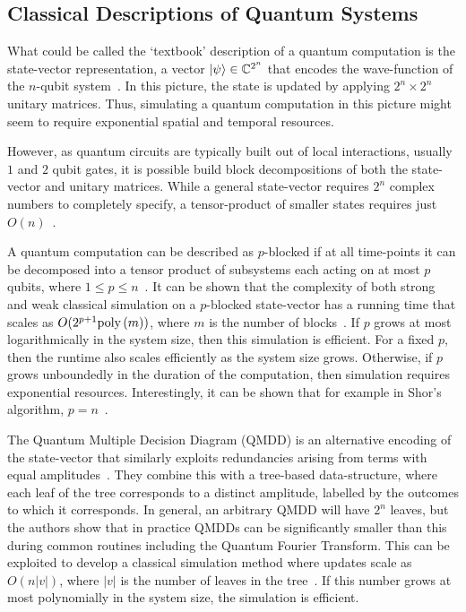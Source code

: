 \subsection{Classical Descriptions of Quantum Systems}\label{sec:intro_classical_desc}
What could be called the `textbook' description of a quantum computation is the state-vector representation, a vector $\ket{\psi}\in\mathbb{C}^{2^{n}}$ that encodes the wave-function of the $n$-qubit system~\cite{Nielsen2000}. In this picture, the state is updated by applying $2^{n}\times 2^{n}$ unitary matrices. Thus, simulating a quantum computation in this picture might seem to require exponential spatial and temporal resources.\par
However, as quantum circuits are typically built out of local interactions, usually $1$ and $2$ qubit gates, it is possible build block decompositions of both the state-vector and unitary matrices. While a general state-vector requires $2^{n}$ complex numbers to completely specify, a tensor-product of smaller states requires just $O\left(n\right)$~\cite{Ekert1998}.\par
A quantum computation can be described as $p$-blocked if at all time-points it can be decomposed into a tensor product of subsystems each acting on at most $p$ qubits, where $1\leq p\leq n$~\cite{Jozsa2003}. It can be shown that the complexity of both strong and weak classical simulation on a $p$-blocked state-vector has a running time that scales as $O(2^{p+1}\text{poly}\left(m\right))$, where $m$ is the number of blocks~\cite{Jozsa2003}. If $p$ grows at most logarithmically in the system size, then this simulation is efficient. For a fixed $p$, then the runtime also scales efficiently as the system size grows. Otherwise, if $p$ grows unboundedly in the duration of the computation, then simulation requires exponential resources. Interestingly, it can be shown that for example in Shor's algorithm, $p=n$~\cite{Ekert1998}.\par
The Quantum Multiple Decision Diagram (QMDD) is an alternative encoding of the state-vector that similarly exploits redundancies arising from terms with equal amplitudes~\cite{Niemann2016}. They combine this with a tree-based data-structure, where each leaf of the tree corresponds to a distinct amplitude, labelled by the outcomes to which it corresponds. In general, an arbitrary QMDD will have $2^{n}$ leaves, but the authors show that in practice QMDDs can be significantly smaller than this during common routines including the Quantum Fourier Transform. This can be exploited to develop a classical simulation method where updates scale as $O\left(n \left|v\right|\right)$, where $\left|v\right|$ is the number of leaves in the tree~\cite{Zulehner2017}. If this number grows at most polynomially in the system size, the simulation is efficient.\par
